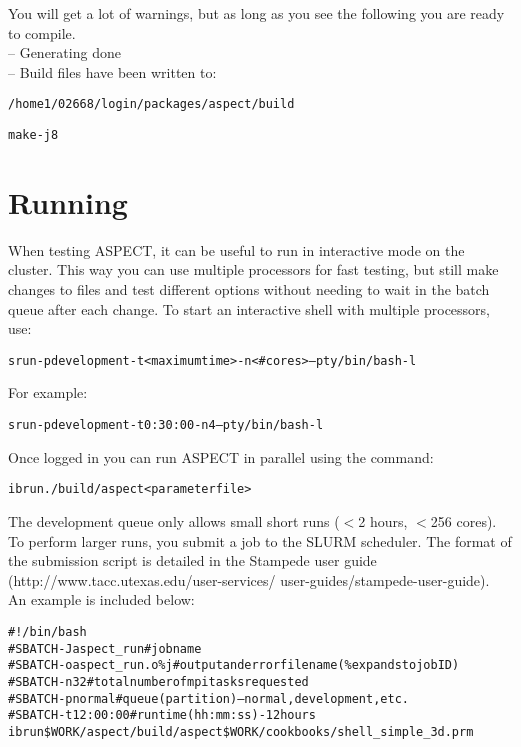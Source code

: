 \documentclass[12pt]{article}
\begin{document}
You will get a lot of warnings, but as long as you see the following you are ready to compile. \\
-- Generating done \\
-- Build files have been written to: \begin{alltt}\footnotesize /home1/02668/login/packages/aspect/build \end{alltt}

 \begin{alltt}\footnotesize
make -j8 
 \end{alltt}

\section{Running}
When testing ASPECT, it can be useful to run in interactive mode on the cluster. This way you can use multiple processors for fast testing, but still make changes to files and test different options without needing to wait in the batch queue after each change. To start an interactive shell with multiple processors, use: 

 \begin{alltt}\footnotesize
srun -p development -t <maximum time> -n <\#cores> --pty /bin/bash -l 
 \end{alltt}

For example: 
 \begin{alltt}\footnotesize
srun -p development -t 0:30:00 -n 4 --pty /bin/bash -l 
 \end{alltt}
 
Once logged in you can run ASPECT in parallel using the command:
 
  \begin{alltt}\footnotesize
ibrun ./build/aspect <parameter file> 
  \end{alltt}
 
The development queue only allows small short runs ($<$2 hours, $<$256 cores). To perform larger runs, you submit a job to the SLURM scheduler. The format of the submission script is detailed in the Stampede user guide (http://www.tacc.utexas.edu/user-services/ user-guides/stampede-user-guide). An example is included below: \\
 
   \begin{alltt}\footnotesize
\#!/bin/bash 
\#SBATCH -J aspect\_run   \# job name 
\#SBATCH -o aspect\_run.o\%j   \# output and error file name (\% expands to jobID) 
\#SBATCH -n 32  \# total number of mpi tasks requested 
\#SBATCH -p normal \# queue (partition) -- normal, development, etc. 
\#SBATCH -t 12:00:00 \# run time (hh:mm:ss) - 12 hours 
ibrun \$WORK/aspect/build/aspect \$WORK/cookbooks/shell\_simple\_3d.prm 
  \end{alltt}
\end{document}
